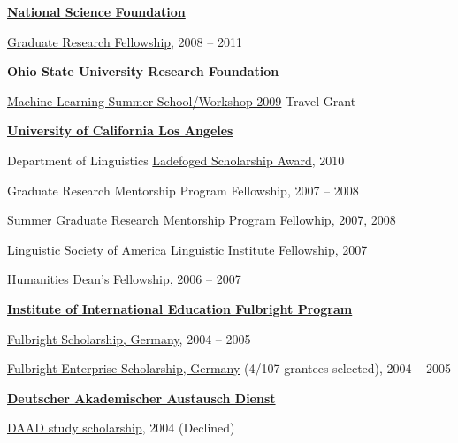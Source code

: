 \documentclass[10pt]{article}
\newcommand{\halfblankline}{\quad\vspace{-0.5\baselineskip}\pagebreak[3]}
\begin{document}
\halfblankline

\href{http://www.nsf.gov/}{\textbf{National Science Foundation}}
\begin{innerlist}
\item \href{http://www.nsf.gov/grfp}
           {Graduate Research Fellowship}, 2008 -- 2011
\end{innerlist}

\halfblankline

\textbf{Ohio State University Research Foundation}
\begin{innerlist}
\item \href{http://www.cse.ohio-state.edu/mlss09/}{Machine Learning Summer School/Workshop 2009} Travel Grant
\end{innerlist}

\halfblankline

\href{http://www.ucla.edu}{\textbf{University of California Los Angeles}}
\begin{innerlist}
\item Department of Linguistics \href{http://www.linguistics.ucla.edu/general/LadefogedScholarship/}{Ladefoged Scholarship Award}, 2010
\item Graduate Research Mentorship Program Fellowship, 2007 -- 2008 
\item Summer Graduate Research Mentorship Program Fellowhip, 2007, 2008
\item Linguistic Society of America Linguistic Institute Fellowship, 2007
\item Humanities Dean's Fellowship, 2006 -- 2007
\end{innerlist}

\halfblankline

\href{http://www.iie.org/fulbright}{\textbf{Institute of International
    Education Fulbright Program}}
\begin{innerlist}
\item \href{http://www.fulbright.de/togermany/}
           {Fulbright Scholarship, Germany}, 2004 -- 2005
\item \href{http://www.fulbright.de/togermany/}
           {Fulbright Enterprise Scholarship, Germany} (4/107 grantees
           selected), 2004 -- 2005
\end{innerlist}

\halfblankline

\href{https://www.daad.org/}{\textbf{Deutscher Akademischer Austausch Dienst}}
\begin{innerlist}
\item \href{https://www.daad.org/?p=73215}
           {DAAD study scholarship}, 2004 (Declined)
\end{innerlist}
\end{document}
